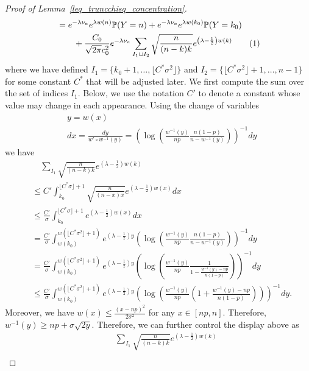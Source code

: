 \documentclass{article}
\newcommand\numberthis{\addtocounter{equation}{1}\tag{\theequation}}
\begin{document}
\begin{proof}[Proof of Lemma~\ref{leq_truncchisq_concentration}]
\begin{align*}
& = e^{-\lambda \nu_a}   e^{\lambda w(n)}\mathbb P(Y = n) +  e^{-\lambda \nu_a}   e^{\lambda w(k_0)}\mathbb P(Y = k_0) \\
& \qquad + \frac{C_0}{\sqrt{2\pi}c_0^2} e^{-\lambda \nu_a} \sum_{I_1 \cup I_2} \sqrt{\frac{n}{(n-k)k}} e^{\left(\lambda - \frac{1}{2}\right)w(k)}\numberthis \label{eq_thirn_term_moment_generating_function}
\end{align*}
where we have defined $I_1 = \{k_0+1, \dots, \lfloor C^* \sigma^2\rfloor \}$ and $I_2 = \{\lfloor C^* \sigma^2\rfloor + 1, \dots, n-1\}$ for some constant $C^*$ that will be adjusted later. 
We first compute the sum over the set of indices $I_1$. 
Below, we use the notation $C'$ to denote a constant whose value may change in each appearance. 
Using the change of variables 
\begin{align*}
    & y = w(x)\\
    & dx = \frac{dy}{w' \circ w^{-1}(y)} = \left(\log\left(\frac{w^{-1}(y)}{np} \frac{n(1-p)}{n-w^{-1}(y)}\right)\right)^{-1} dy
\end{align*}
we have  
\begin{align*}
    & \quad \sum_{I_1} \sqrt{\frac{n}{(n-k)k}} e^{\left(\lambda - \frac{1}{2}\right)w(k)}\\
    & \leq C'\int_{k_0}^{\lfloor C^*\sigma\rfloor +1} \sqrt{\frac{n}{(n-x) x}} e^{(\lambda - \frac{1}{2}) w(x)} dx\\
    & \leq \frac{C'}{\sigma}\int_{k_0}^{\lfloor C^*\sigma\rfloor +1}  e^{(\lambda - \frac{1}{2}) w(x)} dx\\
    & = \frac{C'}{\sigma} \int_{w(k_0)}^{w(\lfloor C^*\sigma^2\rfloor + 1)} e^{(\lambda - \frac{1}{2}) y} \left(\log\left(\frac{w^{-1}(y)}{np} \frac{n(1-p)}{n-w^{-1}(y)}\right)\right)^{-1} dy\\  
    & = \frac{C'}{\sigma} \int_{w(k_0)}^{w(\lfloor C^*\sigma^2\rfloor + 1)} e^{(\lambda - \frac{1}{2}) y} \left(\log\left(\frac{w^{-1}(y)}{np} \frac{1}{1 - \frac{w^{-1}(y) - np}{n(1-p)}}\right)\right)^{-1} dy\\
    & \leq \frac{C'}{\sigma} \int_{w(k_0)}^{w(\lfloor C^*\sigma^2\rfloor + 1)} e^{(\lambda - \frac{1}{2}) y} \left(\log\left(\frac{w^{-1}(y)}{np} \left(1+\frac{ w^{-1}(y) - np}{n(1-p)}\right)\right)\right)^{-1} dy.
\end{align*}
Moreover, we have 
$w(x) \leq \frac{(x-np)^2}{2\sigma^2}$ for any $x \in [np,n]$. 
Therefore, $w^{-1}(y) \geq 
 np + \sigma \sqrt{2y}$. Therefore, we can further control the display above as
 \begin{align*}
     & \quad \sum_{I_1} \sqrt{\frac{n}{(n-k)k}} e^{\left(\lambda - \frac{1}{2}\right)w(k)}\\

\end{align*}
\end{proof}
\end{document}
